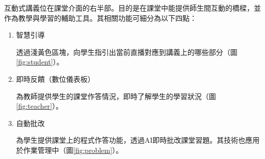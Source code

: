 互動式講義位在課堂介面的右半部。目的是在課堂中能提供師生間互動的橋樑，並作為教學與學習的輔助工具。其相關功能可細分為以下四點：

\begin{enumerate}
  \setlength{\parindent}{2em}

  \item 智慧引導
  \par 透過淺黃色區塊，向學生指引出當前直播對應到講義上的哪些部分（圖\ref{fig:student}）。
  
  \item 即時反饋（數位儀表板）
  \par 為教師提供學生的課堂作答情況，即時了解學生的學習狀況（圖\ref{fig:teacher}）。

  \item 自動批改
  \par 為學生提供課堂上的程式作答功能，透過AI即時批改課堂習題。其技術也應用於作業管理中（圖\ref{fig:problem}）。
  

\end{enumerate}
